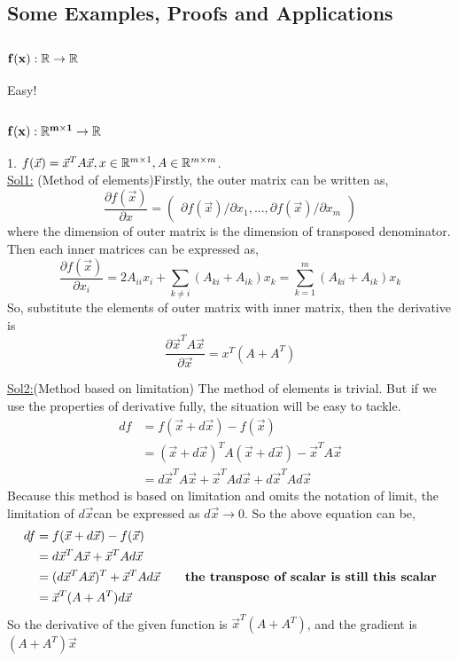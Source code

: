 	\subsection{Some Examples, Proofs and Applications} \label{subsection_examples}
		\subsubsection{$\mathbf{f(x):\mathbb{R}\rightarrow\mathbb{R}}$}
			Easy!
		\subsubsection{$\mathbf{f(x):\mathbb{R}^{m\times 1}\rightarrow\mathbb{R}}$}
			\begin{Examples}{}{}
				1. $f(\vec x)=\vec x^TA\vec x,x\in \mathbb{R}^{m\times1},A\in\mathbb{R}^{m\times m}$. \\
				\underline{Sol1:} (Method of elements)Firstly, the outer matrix can be written as,
				$$\frac{\partial f(\vec x)}{\partial x}=\begin{pmatrix}\partial f(\vec x)/\partial x_1,...,\partial f(\vec x)/\partial x_m \end{pmatrix}$$
				where the dimension of outer matrix is the dimension of transposed denominator. Then each inner matrices can be expressed as,
				$$
				\frac{\partial f(\vec x)}{\partial x_i}=2A_{ii}x_i+\sum_{k\neq i}(A_{ki}+A_{ik})x_k=\sum_{k=1}^{m}(A_{ki}+A_{ik})x_k
				$$
				So, substitute the elements of outer matrix with inner matrix, then the derivative is
				$$
				\frac{\partial \vec x^TA\vec x}{\partial \vec x}=x^T(A+A^T)
				$$
				
				\underline{Sol2:}(Method based on limitation) The method of elements is trivial. But if we use the properties of derivative fully, the situation will be easy to tackle.
				\begin{equation*}
				\begin{split}
					df&=f(\vec x+d\vec x)-f(\vec x)\\
					&=(\vec x+d\vec x)^TA(\vec x+d\vec x)-\vec x^TA\vec x\\
					&=d\vec x^TA\vec x+\vec x^TAd\vec x+d\vec x^TAd\vec x
				\end{split}
				\end{equation*}
				Because this method is based on limitation and omits the notation of limit, the limitation of $d\vec x$can be expressed as $d\vec x\rightarrow 0$. So the above equation can be,
				\begin{equation*}
				\begin{split}
						df&=f(\vec x+d\vec x)-f(\vec x)\\
						&=d\vec x^TA\vec x+\vec x^TAd\vec x\\
						&=(d\vec x^TA\vec x)^T +\vec x^TAd\vec x\quad \quad \text{\textbf{the transpose of scalar is still this scalar}}\\
						&=\vec x^T(A+A^T)d\vec x
				\end{split}
				\end{equation*}
				So the derivative of the given function is $\vec x^T(A+A^T)$, and the gradient is $(A+A^T)\vec x$
				

\end{Examples}
